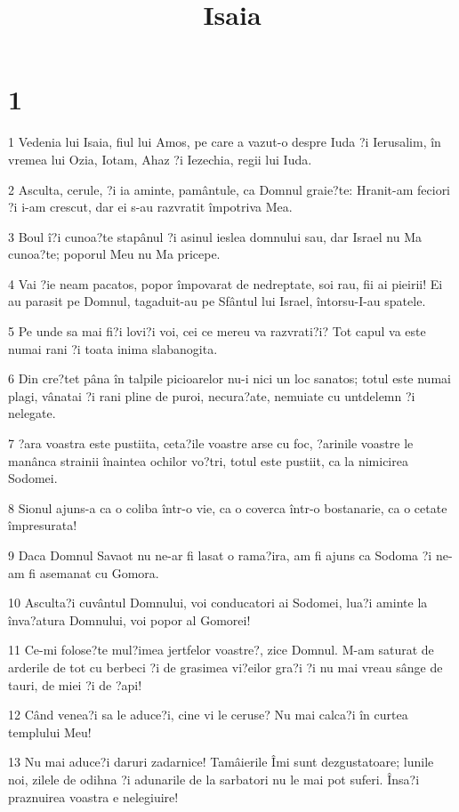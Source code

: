 

\title{Isaia}


\chapter{1}

\par 1 Vedenia lui Isaia, fiul lui Amos, pe care a vazut-o despre Iuda ?i Ierusalim, în vremea lui Ozia, Iotam, Ahaz ?i Iezechia, regii lui Iuda.
\par 2 Asculta, cerule, ?i ia aminte, pamântule, ca Domnul graie?te: Hranit-am feciori ?i i-am crescut, dar ei s-au razvratit împotriva Mea.
\par 3 Boul î?i cunoa?te stapânul ?i asinul ieslea domnului sau, dar Israel nu Ma cunoa?te; poporul Meu nu Ma pricepe.
\par 4 Vai ?ie neam pacatos, popor împovarat de nedreptate, soi rau, fii ai pieirii! Ei au parasit pe Domnul, tagaduit-au pe Sfântul lui Israel, întorsu-I-au spatele.
\par 5 Pe unde sa mai fi?i lovi?i voi, cei ce mereu va razvrati?i? Tot capul va este numai rani ?i toata inima slabanogita.
\par 6 Din cre?tet pâna în talpile picioarelor nu-i nici un loc sanatos; totul este numai plagi, vânatai ?i rani pline de puroi, necura?ate, nemuiate cu untdelemn ?i nelegate.
\par 7 ?ara voastra este pustiita, ceta?ile voastre arse cu foc, ?arinile voastre le manânca strainii înaintea ochilor vo?tri, totul este pustiit, ca la nimicirea Sodomei.
\par 8 Sionul ajuns-a ca o coliba într-o vie, ca o coverca într-o bostanarie, ca o cetate împresurata!
\par 9 Daca Domnul Savaot nu ne-ar fi lasat o rama?ira, am fi ajuns ca Sodoma ?i ne-am fi asemanat cu Gomora.
\par 10 Asculta?i cuvântul Domnului, voi conducatori ai Sodomei, lua?i aminte la înva?atura Domnului, voi popor al Gomorei!
\par 11 Ce-mi folose?te mul?imea jertfelor voastre?, zice Domnul. M-am saturat de arderile de tot cu berbeci ?i de grasimea vi?eilor gra?i ?i nu mai vreau sânge de tauri, de miei ?i de ?api!
\par 12 Când venea?i sa le aduce?i, cine vi le ceruse? Nu mai calca?i în curtea templului Meu!
\par 13 Nu mai aduce?i daruri zadarnice! Tamâierile Îmi sunt dezgustatoare; lunile noi, zilele de odihna ?i adunarile de la sarbatori nu le mai pot suferi. Însa?i praznuirea voastra e nelegiuire!
